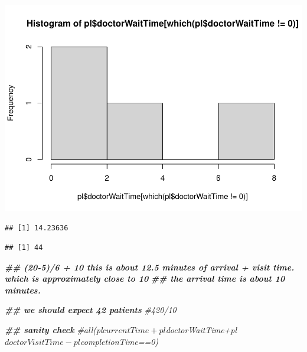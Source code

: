 \documentclass[
]{book}
\newenvironment{Shaded}{\begin{snugshade}}{\end{snugshade}}
\newcommand{\CommentTok}[1]{\textcolor[rgb]{0.56,0.35,0.01}{\textit{#1}}}
\newcommand{\DecValTok}[1]{\textcolor[rgb]{0.00,0.00,0.81}{#1}}
\newcommand{\DocumentationTok}[1]{\textcolor[rgb]{0.56,0.35,0.01}{\textbf{\textit{#1}}}}
\newcommand{\FunctionTok}[1]{\textcolor[rgb]{0.00,0.00,0.00}{#1}}
\newcommand{\NormalTok}[1]{#1}
\newcommand{\SpecialCharTok}[1]{\textcolor[rgb]{0.00,0.00,0.00}{#1}}
\theoremstyle{definition}
\theoremstyle{definition}
\theoremstyle{definition}
\theoremstyle{definition}
\theoremstyle{remark}
\begin{document}
\includegraphics{_main_files/figure-latex/unnamed-chunk-9-3.pdf}

\begin{Shaded}
\end{Shaded}

\begin{verbatim}
## [1] 14.23636
\end{verbatim}

\begin{Shaded}
\end{Shaded}

\begin{verbatim}
## [1] 44
\end{verbatim}

\begin{Shaded}
\begin{Highlighting}[]
\DocumentationTok{\#\# (20{-}5)/6 + 10 this is about 12.5 minutes of arrival + visit time. which is approximately close to 10 }
\DocumentationTok{\#\# the arrival time is about 10 minutes.  }

\DocumentationTok{\#\# we should expect 42 patients}
 \CommentTok{\#420/10}
  
  \DocumentationTok{\#\# sanity check}
  \CommentTok{\#all(pl$currentTime+pl$doctorWaitTime+pl$doctorVisitTime{-}pl$completionTime==0)}
\end{Highlighting}
\end{Shaded}
\end{document}

